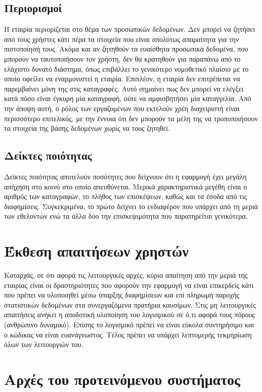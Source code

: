 \documentclass[a4paper,oneside, 12pt]{article}
\begin{document}
\subsection{Περιορισμοί}

Η εταιρία περιορίζεται στο θέμα των προσωπικών δεδομένων. Δεν μπορεί να
ζητήσει από τους χρήστες κάτι πέρα τα στοιχεία που είναι απολύτως
απαραίτητα για την πιστοποίησή τους. Ακόμα και αν ζητηθούν τα ευαίσθητα
προσωπικά δεδομένα, που μπορούν να ταυτοποιήσουν τον χρήστη, δεν θα
κρατηθούν για παραπάνω από το ελάχιστο δυνατό διάστημα, όπως επιβάλλει το
γενικότερο νομοθετικό πλαίσιο με το οποίο οφείλει να εναρμονιστεί η εταιρία.
Επιπλέον, η εταιρία δεν επιτρέπεται να παρεμβαίνει μόνη της στις καταγραφές.
Αυτό σημαίνει πως δεν μπορεί να ελέγξει κατά πόσο είναι έγκυρη μία
καταγραφή, ούτε να αμφισβητήσει μία καταγγελία. Από την άποψη αυτή, ο
ρόλος των εργαζομένων που εκτελούν χρέη διαχειριστή είναι περισσότερο
επιτελικός, με την έννοια ότι δεν μπορούν τα μέλη της να τροποποιήσουν τα
στοιχεία της βάσης δεδομένων χωρίς να τους ζητηθεί.

\subsection{Δείκτες ποιότητας}
Δείκτες ποιότητας αποτελούν ποσότητες που δείχνουν ότι η εφαρμογή έχει
μεγάλη απήχηση στο κοινό στο οποίο απευθύνεται. Μερικά χαρακτηριστικά
μεγέθη είναι ο αριθμός των καταγραφών, το πλήθος των επισκέψεων, καθώς και
τα έσοδα από τις διαφημίσεις. Συγκεκριμένα, το πρώτο δείχνει το ενδιαφέρον
που υπάρχει από τη μεριά των εθελοντών ενώ τα άλλα δύο την επισκεψιμότητα
που παρατηρείται γενικότερα.

\section{Έκθεση απαιτήσεων χρηστών}
Καταρχάς, σε ότι αφορά τις λειτουργικές αρχές, κύρια απαίτηση από την μεριά
της εταιρίας είναι οι δραστηριότητες που αφορούν την εφαρμογή να είναι
επικερδείς κάτι που πρέπει να υλοποιηθεί μέσω ύπαρξης διαφημίσεων και επί
πληρωμή παροχής στατιστικών δεδομένων στα συνεργαζόμενα πρατήρια
καυσίμων.
Στις μη λειτουργικές απαιτήσεις ανήκει η αποδοτική υλοποίηση του λογισμικού σε
ό,τι αφορά τους πόρους (ανθρώπινο δυναμικό). Επίσης το λογισμικό πρέπει να
είναι εύκολα συντηρήσιμο και ο κώδικας να είναι ευανάγνωστος. Τέλος πρέπει
να υπάρχει λεπτομερής τεκμηρίωση όλων των λειτουργιών του.

\section{Αρχές του προτεινόμενου συστήματος}
\end{document}
